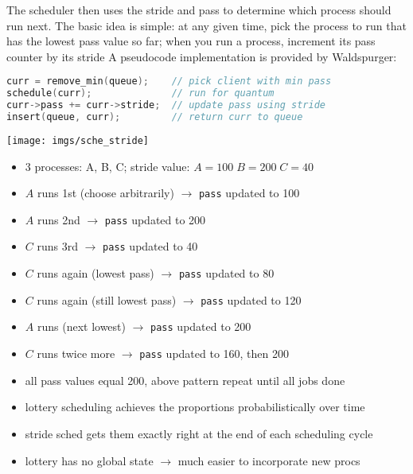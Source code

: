 The scheduler then uses the stride and pass to determine which process should run next. The basic idea is simple: at any given time, pick
the process to run that has the lowest pass value so far; when you run
a process, increment its pass counter by its stride  A pseudocode implementation is provided by Waldspurger:
\begin{lstlisting}[language=c]
curr = remove_min(queue);    // pick client with min pass
schedule(curr);              // run for quantum
curr->pass += curr->stride;  // update pass using stride
insert(queue, curr);         // return curr to queue
\end{lstlisting}
\texttt{[image: imgs/sche\_stride]}
\begin{itemize}
\item 3 processes: A, B, C; stride value: $A = 100\;B = 200\; C=40$
\item $A$ runs 1st (choose arbitrarily) $\to$ \texttt{pass} updated to 100
\item $A$ runs 2nd  $\to$  \texttt{pass} updated to 200
\item $C$ runs 3rd  $\to$  \texttt{pass} updated to 40
\item $C$ runs again (lowest pass)  $\to$  \texttt{pass} updated to 80
\item $C$ runs again (still lowest pass) $\to$ \texttt{pass} updated to 120
\item $A$ runs (next lowest) $\to$  \texttt{pass} updated to 200
\item $C$ runs twice more $\to$ \texttt{pass} updated to 160, then 200
\item all pass values equal 200, above pattern repeat until all jobs done
\item lottery scheduling achieves the proportions probabilistically over time
\item stride sched gets them exactly right at the end of each scheduling cycle
\item lottery has no global state $\to$ much easier to incorporate new procs
\end{itemize}
